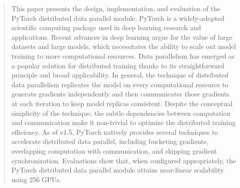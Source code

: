 \begin{abstract}

This paper presents the design, implementation, and evaluation of the PyTorch distributed data parallel module. PyTorch is a widely-adopted scientific computing package used in deep learning research and applications. Recent advances in deep learning argue for the value of large datasets and large models, which necessitates the ability to scale out model training to more computational resources. Data parallelism has emerged as a popular solution for distributed training thanks to its straightforward principle and broad applicability. In general, the technique of distributed data parallelism replicates the model on every computational resource to generate gradients independently and then communicates those gradients at each iteration to keep model replicas consistent. Despite the conceptual simplicity of the technique, the subtle dependencies between computation and communication make it non-trivial to optimize the distributed training efficiency. As of v1.5, PyTorch natively provides several techniques to accelerate distributed data parallel, including bucketing gradients, overlapping computation with communication, and skipping gradient synchronization. Evaluations show that, when configured appropriately, the PyTorch distributed data parallel module attains near-linear scalability using 256 GPUs.

\end{abstract}